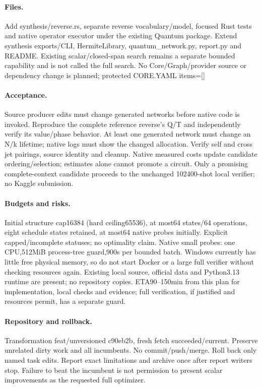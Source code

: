 \documentclass{article}
\begin{document}
\paragraph{Files.} Add synthesis/reverse.rs, separate reverse vocabulary/model,
focused Rust tests and native operator executor under the existing Quantum
package. Extend synthesis exports/CLI, HermiteLibrary, quantum\_network.py,
report.py and README. Existing scalar/closed-span search remains a separate
bounded capability and is not called the full search. No Core/Graph/provider
source or dependency change is planned; protected CORE.YAML items=[]
\paragraph{Acceptance.} Source producer edits must change generated networks
before native code is invoked. Reproduce the complete reference reverse's
Q/T and independently verify its value/phase behavior. At least one generated
network must change an N/k lifetime; native logs must show the changed allocation.
Verify self and cross jet pairings, source identity and cleanup. Native measured
costs update candidate ordering/selection; estimates alone cannot promote a
circuit. Only a promising complete-context candidate proceeds to the unchanged
102400-shot local verifier; no Kaggle submission.
\paragraph{Budgets and risks.} Initial structure cap16384 (hard ceiling65536),
at most64 states/64 operations, eight schedule states retained, at most64 native
probes initially. Explicit capped/incomplete statuses; no optimality claim.
Native small probes: one CPU,512MiB process-tree guard,900s per bounded batch.
Windows currently has little free physical memory, so do not start Docker or a
large full verifier without checking resources again. Existing local source,
official data and Python3.13 runtime are present; no repository copies.
ETA90--150min from this plan for implementation, local checks and evidence;
full verification, if justified and resources permit, has a separate guard.
\paragraph{Repository and rollback.} Transformation feat/unversioned c90eb2b,
fresh fetch succeeded/current. Preserve unrelated dirty work and all incumbents.
No commit/push/merge. Roll back only named task edits. Report exact limitations
and archive once after report writers stop. Failure to beat the incumbent is not
permission to present scalar improvements as the requested full optimizer.
\end{document}
